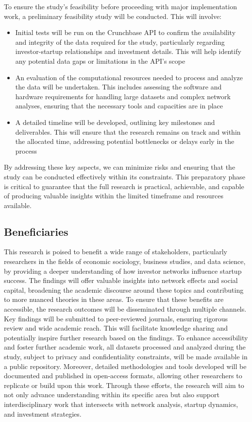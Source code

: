 \documentclass[a4paper,11pt]{article}
\begin{document}
To ensure the study's feasibility before proceeding with major implementation work, a preliminary feasibility study will be conducted. This will involve:
\begin{itemize}
    \item Initial tests will be run on the Crunchbase API to confirm the availability and integrity of the data required for the study, particularly regarding investor-startup relationships and investment details. This will help identify any potential data gaps or limitations in the API's scope
    \item An evaluation of the computational resources needed to process and analyze the data will be undertaken. This includes assessing the software and hardware requirements for handling large datasets and complex network analyses, ensuring that the necessary tools and capacities are in place
    \item A detailed timeline will be developed, outlining key milestones and deliverables. This will ensure that the research remains on track and within the allocated time, addressing potential bottlenecks or delays early in the process
\end{itemize}

By addressing these key aspects, we can minimize risks and ensuring that the study can be conducted effectively within its constraints. This preparatory phase is critical to guarantee that the full research is practical, achievable, and capable of producing valuable insights within the limited timeframe and resources available.

\subsection{Beneficiaries}

This research is poised to benefit a wide range of stakeholders, particularly researchers in the fields of economic sociology, business studies, and data science, by providing a deeper understanding of how investor networks influence startup success. The findings will offer valuable insights into network effects and social capital, broadening the academic discourse around these topics and contributing to more nuanced theories in these areas. To ensure that these benefits are accessible, the research outcomes will be disseminated through multiple channels. Key findings will be submitted to peer-reviewed journals, ensuring rigorous review and wide academic reach. This will facilitate knowledge sharing and potentially inspire further research based on the findings. To enhance accessibility and foster further academic work, all datasets processed and analyzed during the study, subject to privacy and confidentiality constraints, will be made available in a public repository. Moreover, detailed methodologies and tools developed will be documented and published in open-access formats, allowing other researchers to replicate or build upon this work. Through these efforts, the research will aim to not only advance understanding within its specific area but also support interdisciplinary work that intersects with network analysis, startup dynamics, and investment strategies.
\end{document}
